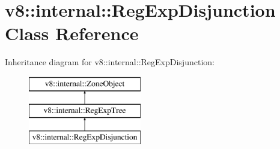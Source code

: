 \hypertarget{classv8_1_1internal_1_1_reg_exp_disjunction}{}\section{v8\+:\+:internal\+:\+:Reg\+Exp\+Disjunction Class Reference}
\label{classv8_1_1internal_1_1_reg_exp_disjunction}
Inheritance diagram for v8\+:\+:internal\+:\+:Reg\+Exp\+Disjunction\+:\begin{figure}[H]
\begin{center}
\leavevmode
\includegraphics[height=3.000000cm]{classv8_1_1internal_1_1_reg_exp_disjunction}
\end{center}
\end{figure}
